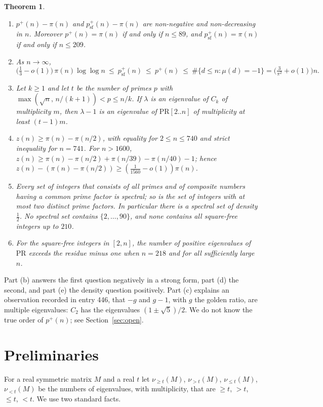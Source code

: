 \documentclass[11pt]{amsart}
\newtheorem{theorem}{Theorem}[section]
\theoremstyle{definition}
\theoremstyle{remark}
\newcommand{\PR}{\mathrm{PR}}
\newcommand{\pp}{p^{+}}
\newcommand{\nuge}[1]{\nu_{\ge #1}}
\newcommand{\nule}[1]{\nu_{\le #1}}
\begin{document}
\begin{theorem}\label{thm:main}
\begin{enumerate}[label=\textup{(\alph*)}]
\item $\pp(n)-\pi(n)$ and $\pp_{\mathrm{sf}}(n)-\pi(n)$ are non-negative and non-decreasing in $n$. Moreover $\pp(n)=\pi(n)$ if and only if $n\le89$, and $\pp_{\mathrm{sf}}(n)=\pi(n)$ if and only if $n\le209$.
\item As $n\to\infty$,
\[
\bigl(\tfrac13-o(1)\bigr)\,\pi(n)\log\log n\ \le\ \pp_{\mathrm{sf}}(n)\ \le\ \pp(n)\ \le\ \#\{d\le n:\mu(d)=-1\}=\bigl(\tfrac{3}{\pi^2}+o(1)\bigr)n .
\]
\item Let $k\ge1$ and let $t$ be the number of primes $p$ with $\max(\sqrt n,\,n/(k+1))<p\le n/k$. If $\lambda$ is an eigenvalue of $C_k$ of multiplicity $m$, then $\lambda-1$ is an eigenvalue of $\PR[2..n]$ of multiplicity at least $(t-1)m$.
\item $z(n)\ge\pi(n)-\pi(n/2)$, with equality for $2\le n\le740$ and strict inequality for $n=741$. For $n>1600$,
$z(n)\ge\pi(n)-\pi(n/2)+\pi(n/39)-\pi(n/40)-1$; hence $z(n)-(\pi(n)-\pi(n/2))\ge(\tfrac1{1560}-o(1))\pi(n)$.
\item Every set of integers that consists of all primes and of composite numbers having a common prime factor is spectral; so is the set of integers with at most two distinct prime factors. In particular there is a spectral set of density $\tfrac12$. No spectral set contains $\{2,\dots,90\}$, and none contains all square-free integers up to $210$.
\item For the square-free integers in $[2,n]$, the number of positive eigenvalues of $\PR$ exceeds the residue minus one when $n=218$ and for all sufficiently large $n$.
\end{enumerate}
\end{theorem}

Part (b) answers the first question negatively in a strong form, part (d) the second, and part (e) the density question positively. Part (c) explains an observation recorded in entry 446, that $-g$ and $g-1$, with $g$ the golden ratio, are multiple eigenvalues: $C_2$ has the eigenvalues $(1\pm\sqrt5)/2$. We do not know the true order of $\pp(n)$; see Section~\ref{sec:open}.

\section{Preliminaries}

For a real symmetric matrix $M$ and a real $t$ let $\nuge{t}(M)$, $\nu_{>t}(M)$, $\nule{t}(M)$, $\nu_{<t}(M)$ be the numbers of eigenvalues, with multiplicity, that are $\ge t$, $>t$, $\le t$, $<t$. We use two standard facts.
\end{document}
